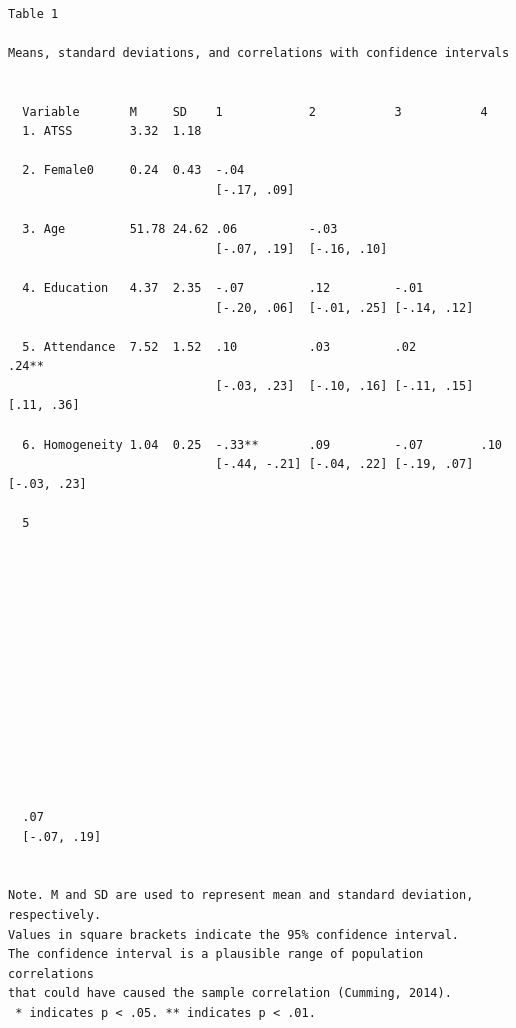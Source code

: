 \documentclass[
  11pt,
]{book}
\begin{document}
\begin{verbatim}

Table 1 

Means, standard deviations, and correlations with confidence intervals
 

  Variable       M     SD    1            2           3           4          
  1. ATSS        3.32  1.18                                                  
                                                                             
  2. Female0     0.24  0.43  -.04                                            
                             [-.17, .09]                                     
                                                                             
  3. Age         51.78 24.62 .06          -.03                               
                             [-.07, .19]  [-.16, .10]                        
                                                                             
  4. Education   4.37  2.35  -.07         .12         -.01                   
                             [-.20, .06]  [-.01, .25] [-.14, .12]            
                                                                             
  5. Attendance  7.52  1.52  .10          .03         .02         .24**      
                             [-.03, .23]  [-.10, .16] [-.11, .15] [.11, .36] 
                                                                             
  6. Homogeneity 1.04  0.25  -.33**       .09         -.07        .10        
                             [-.44, -.21] [-.04, .22] [-.19, .07] [-.03, .23]
                                                                             
  5          
             
             
             
             
             
             
             
             
             
             
             
             
             
             
  .07        
  [-.07, .19]
             

Note. M and SD are used to represent mean and standard deviation, respectively.
Values in square brackets indicate the 95% confidence interval.
The confidence interval is a plausible range of population correlations 
that could have caused the sample correlation (Cumming, 2014).
 * indicates p < .05. ** indicates p < .01.
 
\end{verbatim}
\end{document}
